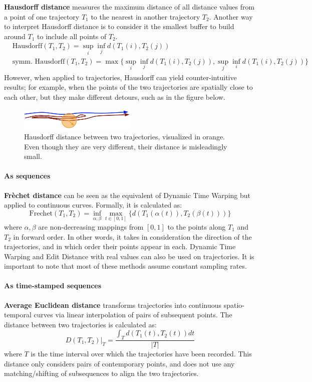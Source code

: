 \textbf{Hausdorff distance} measures the maximum distance of all distance values from a point of one trajectory $T_1$ to the nearest in another trajectory $T_2$. Another way to interpret Hausdorff distance is to consider it the smallest buffer to build around $T_1$ to include all points of $T_2$.
\begin{align*}
    &\text{Hausdorff}(T_1, T_2) = \sup_{i} \inf_j d(T_1(i), T_2(j)) \\
    &\text{symm. Hausdorff}(T_1, T_2) = \max \{\sup_{i} \inf_{j} d(T_{1}(i), T_{2}(j)), \sup_{j} \inf_{i} d(T_{1}(i), T_{2}(j)) \}
\end{align*}
However, when applied to trajectories, Hausdorff can yield counter-intuitive results; for example, when the points of the two trajectories are spatially close to each other, but they make different detours, such as in the figure below.
\begin{figure}[h]
    \centering
    \includegraphics[width=0.5\textwidth]{img/dist_haus.png}
    \caption{Hausdorff distance between two trajectories, visualized in orange. Even though they are very different, their distance is misleadingly small.}
\end{figure} 

\paragraph{As sequences}
\textbf{Frèchet distance} can be seen as the equivalent of Dynamic Time Warping but applied to continuous curves. Formally, it is calculated as:
\begin{equation*}
    \text{Frechet}(T_1, T_2) = \inf_{\alpha, \beta} \max_{t \in [0,1]} \{ d(T_1(\alpha(t)), T_2(\beta(t)))\}
\end{equation*}
where $\alpha, \beta$ are non-decreasing mappings from $[0,1]$ to the points along $T_1$ and $T_2$ in forward order. In other words, it takes in consideration the direction of the trajectories, and in which order their points appear in each. Dynamic Time Warping and Edit Distance with real values can also be used on trajectories. It is important to note that most of these methods assume constant sampling rates.

\paragraph{As time-stamped sequences}
\textbf{Average Euclidean distance} transforms trajectories into continuous spatio-temporal curves via linear interpolation of pairs of subsequent points. The distance between two trajectories is calculated as:
\begin{equation*}
    D(T_1, T_2)|_T = \frac{\int_T d(T_1(t), T_2(t)) dt}{|T|}
\end{equation*}
where $T$ is the time interval over which the trajectories have been recorded. This distance only considers pairs of contemporary points, and does not use any matching/shifting of subsequences to align the two trajectories.

